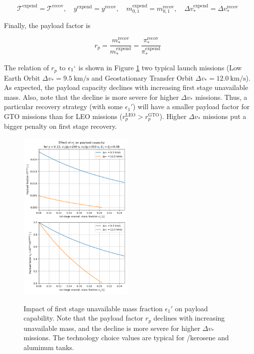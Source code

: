 \documentclass[conf]{new-aiaa}
\begin{document}
\begin{equation}
\mathcal{T}^{\mathrm{expend}} = \mathcal{T}^{\mathrm{recov}}, \quad y^{\mathrm{expend}} = y^{\mathrm{recov}}, \quad m_{0,1}^{\mathrm{expend}} = m_{0,1}^{\mathrm{recov}}, \quad \Delta v_*^{\mathrm{expend}} = \Delta v_*^{\mathrm{recov}}
\end{equation}

Finally, the payload factor is

\begin{equation}
r_p = \frac{m_*^{\mathrm{recov}}}{m_*^{\mathrm{expend}}} = \frac{\pi_*^{\mathrm{recov}}}{\pi_*^{\mathrm{expend}}}
\end{equation}

The relation of $r_p$ to $\epsilon_1`$ is shown in Figure \ref{fig:payload} two typical launch missions (Low Earth Orbit $\Delta v_* = \SI{9.5}{\kilo\meter\per\second}$ and Geostationary Transfer Orbit $\Delta v_* = \SI{12.0}{\kilo\meter\per\second}$). As expected, the payload capacity declines with increasing first stage unavailable mass. Also, note that the decline is more severe for higher $\Delta v_*$ missions. Thus, a particular recovery strategy (with some $\epsilon_1'$) will have a smaller payload factor for GTO missions than for LEO missions ($r_p^{\mathrm{LEO}} > r_p^\mathrm{GTO}$). Higher $\Delta v_*$ missions put a bigger penalty on first stage recovery. 

\begin{figure}[hbt!]
	\centering
	\includegraphics[width=0.5\textwidth]{../payload}
	\label{fig:payload}
	\caption{Impact of first stage unavailable mass fraction $\epsilon_1'$ on payload capability. Note that the payload factor $r_p$ declines with increasing unavailable mass, and the decline is more severe for higher $\Delta v_*$ missions. The technology choice values are typical for /kerosene and aluminum tanks.}
\end{figure}
\end{document}
